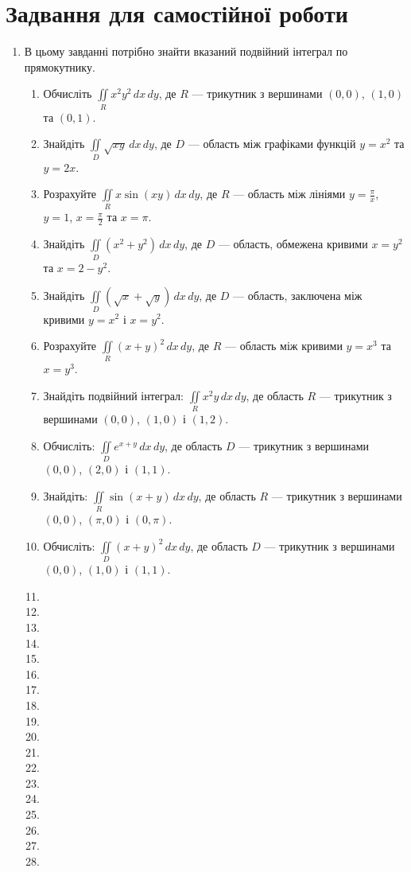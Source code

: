 \chapter{Задвання для самостійної роботи}
\begin{enumerate}
\item  В цьому завданні потрібно знайти вказаний подвійний інтеграл по прямокутнику.
\begin{enumerate}[label*=\arabic*.]
\item Обчисліть ${{\iint\limits_R x^2y^2 \,dx\,dy}}$, де ${{R}}$ --- трикутник з вершинами ${(0,0)}$, ${(1,0)}$ та ${(0,1)}$.
\item Знайдіть ${\iint\limits_D \sqrt{xy} \,dx\,dy}$, де ${D}$ --- область між графіками функцій ${y = x^2}$ та ${y = 2x}$.
\item Розрахуйте ${\iint\limits_R x\sin(xy) \,dx\,dy}$, де ${R}$ --- область між лініями ${y = \frac{\pi}{x}}$, ${y = 1}$, ${x = \frac{\pi}{2}}$ та ${x = \pi}$.
\item Знайдіть ${\iint\limits_D (x^2 + y^2) \,dx\,dy}$, де ${D}$ --- область, обмежена кривими ${x = y^2}$ та ${x = 2-y^2}$.
\item Знайдіть ${\iint\limits_D \left(\sqrt{x} + \sqrt{y}\right) \,dx\,dy}$, де ${D}$ --- область, заключена між кривими ${y = x^2}$ і ${x = y^2}$.
\item Розрахуйте ${\iint\limits_R  (x +y)^{2} \,dx\,dy}$, де ${R}$ --- область між кривими ${y = x^3}$ та ${x = y^3}$.
  \item Знайдіть подвійний інтеграл: $\iint\limits_R x^2y\,dx\,dy$, де область $R$ --- трикутник з вершинами $(0,0)$, $(1,0)$ і $(1,2)$.
  \item Обчисліть: $\iint\limits_D e^{x+y}\,dx\,dy$, де область $D$ --- трикутник з вершинами $(0,0)$, $(2,0)$ і $(1,1)$.
  \item Знайдіть: $\iint\limits_R \sin(x+y)\,dx\,dy$, де область $R$ --- трикутник з вершинами $(0,0)$, $(\pi,0)$ і $(0,\pi)$.
  \item Обчисліть: $\iint\limits_D (x+y)^2\,dx\,dy$, де область $D$ --- трикутник з вершинами $(0,0)$, $(1,0)$ і $(1,1)$.
\item
\item
\item
\item
\item
\item
\item
\item
\item
\item
\item
\item
\item
\item
\item
\item
\item
\item
\end{enumerate}
\end{enumerate}

